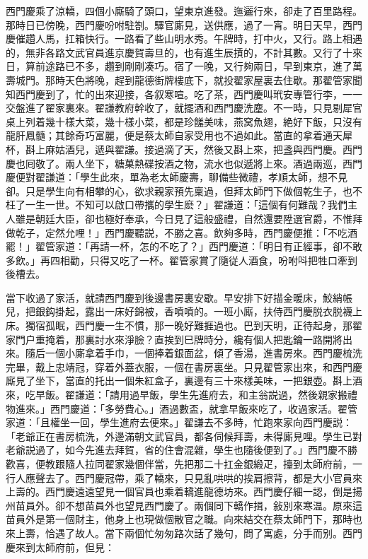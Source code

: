 西門慶乘了涼轎，四個小廝騎了頭口，望東京進發。迤邐行來，卻走了百里路程。那時日已傍晚，西門慶吩咐駐劄。驛官廝見，送供應，過了一宵。明日天早，西門慶催趲人馬，扛箱快行。一路看了些山明水秀。午牌時，打中火，又行。路上相遇的，無非各路文武官員進京慶賀壽旦的，也有進生辰摃的，不計其數。又行了十來日，算前途路已不多，趲到剛剛凑巧。宿了一晚，又行夠兩日，早到東京，進了萬壽城門。那時天色將晚，趕到龍德街牌樓底下，就投翟家屋裏去住歇。那翟管家聞知西門慶到了，忙的出來迎接，各叙寒喧。吃了茶，西門慶叫玳安專管行李，一一交盤進了翟家裏來。翟謙教府幹收了，就擺酒和西門慶洗塵。不一時，只見剔犀官桌上列着幾十樣大菜，幾十樣小菜，都是珍饈美味，燕窝魚翅，絶好下飯，只沒有龍肝鳳髓；其餘奇巧富麗，便是蔡太師自家受用也不過如此。當直的拿着通天犀杯，斟上麻姑酒兒，遞與翟謙。接過滴了天，然後又斟上來，把盞與西門慶。西門慶也囘敬了。兩人坐下，糖菓熱碟按酒之物，流水也似遞將上來。酒過兩巡，西門慶便對翟謙道：「學生此來，單為老太師慶壽，聊備些微禮，孝順太師，想不見卻。只是學生向有相攀的心，欲求親家預先稟過，但拜太師門下做個乾生子，也不枉了一生一世。不知可以啟口帶攜的學生麽？」翟謙道：「這個有何難哉？我們主人雖是朝廷大臣，卻也極好奉承，今日見了這般盛禮，自然還要陞選官爵，不惟拜做乾子，定然允哩！」西門慶聽説，不勝之喜。飲夠多時，西門慶便推：「不吃酒罷！」翟管家道：「再請一杯，怎的不吃了？」西門慶道：「明日有正經事，卻不敢多飲。」再四相勸，只得又吃了一杯。翟管家賞了隨従人酒食，吩咐呌把牲口牽到後槽去。

當下收過了家活，就請西門慶到後邊書房裏安歇。早安排下好描金暖床，鮫綃帳兒，把銀鈎掛起，露出一床好錦被，香噴噴的。一班小廝，扶侍西門慶脱衣脱襪上床。獨宿孤眠，西門慶一生不慣，那一晚好難捱過也。巴到天明，正待起身，那翟家門户重掩着，那裏討水來淨臉？直挨到巳牌時分，纔有個人把匙鑰一路開將出來。隨后一個小廝拿着手巾，一個捧着銀面盆，傾了香湯，進書房來。西門慶梳洗完畢，戴上忠靖冠，穿着外蓋衣服，一個在書房裏坐。只見翟管家出來，和西門慶廝見了坐下，當直的托出一個朱紅盒子，裏邊有三十來樣美味，一把銀壺。斟上酒來，吃早飯。翟謙道：「請用過早飯，學生先進府去，和主翁説過，然後親家搬禮物進來。」西門慶道：「多勞費心。」酒過數盃，就拿早飯來吃了，收過家活。翟管家道：「且權坐一回，學生進府去便來。」翟謙去不多時，忙跑來家向西門慶説：「老爺正在書房梳洗，外邊滿朝文武官員，都各伺候拜壽，未得廝見哩。學生已對老爺説過了，如今先進去拜賀，省的住會混雜，學生也隨後便到了。」西門慶不勝歡喜，便教跟隨人拉同翟家幾個伴當，先把那二十扛金銀緞疋，擡到太師府前，一行人應聲去了。西門慶冠帶，乘了轎來，只見亂哄哄的挨肩擦背，都是大小官員來上壽的。西門慶遠遠望見一個官員也乘着轎進龍德坊來。西門慶仔細一認，倒是揚州苗員外。卻不想苗員外也望見西門慶了。兩個同下轎作揖，敍別來寒温。原來這苗員外是第一個財主，他身上也現做個散官之職。向來結交在蔡太師門下，那時也來上壽，恰遇了故人。當下兩個忙匆匆路次話了幾句，問了寓處，分手而别。西門慶來到太師府前，但見：

